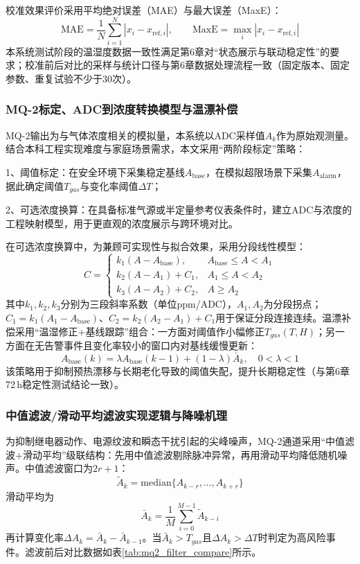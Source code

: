 \documentclass[UTF8,12pt,a4paper,oneside]{ctexbook}
\newcommand{\kuan}[1]{\par\noindent\CJKfamily{song}\zihao{-4}#1、}
\numberwithin{equation}{chapter}
\begin{document}
校准效果评价采用平均绝对误差（MAE）与最大误差（MaxE）：
\begin{equation}
\mathrm{MAE}=\frac{1}{N}\sum_{i=1}^{N}|x_i-x_{\mathrm{ref},i}|,
\qquad
\mathrm{MaxE}=\max_i |x_i-x_{\mathrm{ref},i}|
\label{eq:mae_maxe}
\end{equation}
本系统测试阶段的温湿度数据一致性满足第6章对“状态展示与联动稳定性”的要求；校准前后对比的采样与统计口径与第6章数据处理流程一致（固定版本、固定参数、重复试验不少于30次）。

\subsubsection*{MQ-2标定、ADC到浓度转换模型与温漂补偿}
MQ-2输出为与气体浓度相关的模拟量，本系统以ADC采样值$A_k$作为原始观测量。结合本科工程实现难度与家庭场景需求，本文采用“两阶段标定”策略：  
\kuan{1}阈值标定：在安全环境下采集稳定基线$A_{\mathrm{base}}$，在模拟超限场景下采集$A_{\mathrm{alarm}}$，据此确定阈值$T_{gas}$与变化率阈值$\Delta T$；  
\kuan{2}可选浓度换算：在具备标准气源或半定量参考仪表条件时，建立ADC与浓度的工程映射模型，用于更直观的浓度展示与跨环境对比。

在可选浓度换算中，为兼顾可实现性与拟合效果，采用分段线性模型：
\begin{equation}
C=
\begin{cases}
k_1(A-A_{\mathrm{base}}), & A_{\mathrm{base}}\le A<A_1\\
k_2(A-A_1)+C_1, & A_1\le A<A_2\\
k_3(A-A_2)+C_2, & A\ge A_2
\end{cases}
\label{eq:mq2_piecewise}
\end{equation}
其中$k_1,k_2,k_3$分别为三段斜率系数（单位ppm/ADC），$A_1,A_2$为分段拐点；$C_1=k_1(A_1-A_{\mathrm{base}})$、$C_2=k_2(A_2-A_1)+C_1$用于保证分段连接连续。温漂补偿采用“温湿修正+基线跟踪”组合：一方面对阈值作小幅修正$T_{gas}(T,H)$；另一方面在无告警事件且变化率较小的窗口内对基线缓慢更新：
\begin{equation}
A_{\mathrm{base}}(k)=\lambda A_{\mathrm{base}}(k-1)+(1-\lambda)\bar{A}_k,\quad 0<\lambda<1
\label{eq:mq2_baseline_track}
\end{equation}
该策略用于抑制预热漂移与长期老化导致的阈值失配，提升长期稳定性（与第6章72\,h稳定性测试结论一致）。

\subsubsection*{中值滤波/滑动平均滤波实现逻辑与降噪机理}
为抑制继电器动作、电源纹波和瞬态干扰引起的尖峰噪声，MQ-2通道采用“中值滤波+滑动平均”级联结构：先用中值滤波剔除脉冲异常，再用滑动平均降低随机噪声。中值滤波窗口为$2r+1$：
\begin{equation}
\tilde{A}_k=\mathrm{median}\{A_{k-r},\ldots,A_{k+r}\}
\label{eq:median_filter}
\end{equation}
滑动平均为
\begin{equation}
\bar{A}_k=\frac{1}{M}\sum_{i=0}^{M-1}\tilde{A}_{k-i}
\label{eq:mean_filter}
\end{equation}
再计算变化率$\Delta A_k=\bar{A}_k-\bar{A}_{k-1}$。当$\bar{A}_k>T_{gas}$且$\Delta A_k>\Delta T$时判定为高风险事件。滤波前后对比数据如表\ref{tab:mq2_filter_compare}所示。
\end{document}

